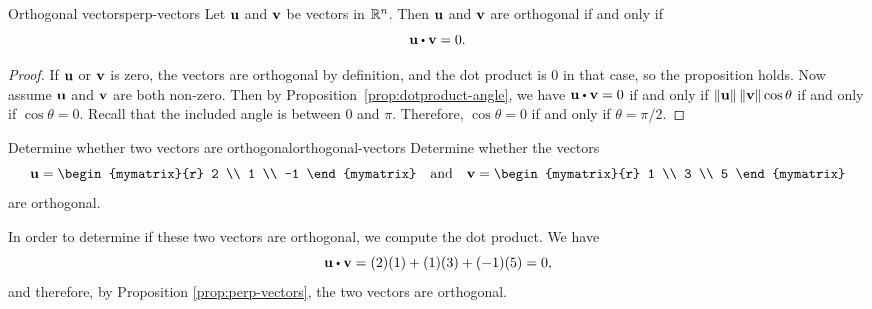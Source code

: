 \begin{proposition}{Orthogonal vectors}{perp-vectors}
  Let $\mbox{\bf u}$ and $\mbox{\bf v}$ be vectors in $\mathbb{R}^n$. Then $\mbox{\bf u}$
  and $\mbox{\bf v}$ are orthogonal if and only
  if
  \begin{equation*}
    \vect{u} \dotprod \vect{v} = 0.
  \end{equation*}
\end{proposition}

\begin{proof}
  If $\mbox{\bf u}$ or $\mbox{\bf v}$ is zero, the vectors are orthogonal by
  definition, and the dot product is $0$ in that case, so the
  proposition holds. Now assume $\mbox{\bf u}$ and $\mbox{\bf v}$ are both
  non-zero.  Then by Proposition~\ref{prop:dotproduct-angle}, we have
  $\vect{u} \dotprod \vect{v} = 0$ if and only if
  $\left\|\mbox{\bf u}\right\| \left\|\mbox{\bf v}\right\| \cos \theta$ if and only if
  $\cos\theta=0$. Recall that the included angle is between $0$ and
  $\pi$. Therefore, $\cos\theta=0$ if and only if $\theta=\pi/2$.
\end{proof}

\begin{example}{Determine whether two vectors are orthogonal}{orthogonal-vectors}
Determine whether the vectors
\begin{equation*}
\vect{u}=
\begin{mymatrix}{r}
2 \\
1 \\
-1 
\end{mymatrix}
\quad\mbox{and}\quad
\vect{v} 
=
\begin{mymatrix}{r}
1 \\
3 \\
5
\end{mymatrix}
\end{equation*}
are orthogonal.
\end{example}

\begin{solution}
  In order to determine if these two vectors are orthogonal, we
  compute the dot product. We have
  \begin{equation*}
    \vect{u} \dotprod \vect{v}
    =
    (2)(1) + (1)(3) + (-1)(5)
    =
    0,
  \end{equation*}
  and therefore, by Proposition \ref{prop:perp-vectors}, the two vectors are orthogonal.
\end{solution}
